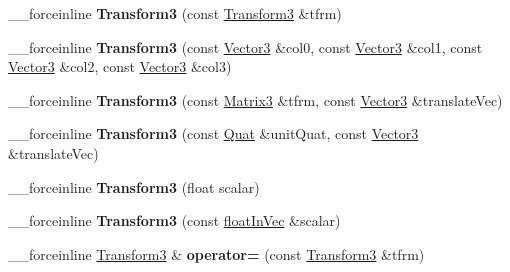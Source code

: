 \begin{DoxyCompactItemize}
\item 
\hypertarget{classVectormath_1_1Aos_1_1Transform3_a1b65bd72a55a4edb987e0eb8ae11c955}{\-\_\-\-\_\-forceinline {\bfseries Transform3} (const \hyperlink{classVectormath_1_1Aos_1_1Transform3}{Transform3} \&tfrm)}\label{classVectormath_1_1Aos_1_1Transform3_a1b65bd72a55a4edb987e0eb8ae11c955}

\item 
\hypertarget{classVectormath_1_1Aos_1_1Transform3_a5ee59b63263a7a38c97a17f1e32a701f}{\-\_\-\-\_\-forceinline {\bfseries Transform3} (const \hyperlink{classVectormath_1_1Aos_1_1Vector3}{Vector3} \&col0, const \hyperlink{classVectormath_1_1Aos_1_1Vector3}{Vector3} \&col1, const \hyperlink{classVectormath_1_1Aos_1_1Vector3}{Vector3} \&col2, const \hyperlink{classVectormath_1_1Aos_1_1Vector3}{Vector3} \&col3)}\label{classVectormath_1_1Aos_1_1Transform3_a5ee59b63263a7a38c97a17f1e32a701f}

\item 
\hypertarget{classVectormath_1_1Aos_1_1Transform3_a054faf5eb727d2c7ea2c139021e3ae63}{\-\_\-\-\_\-forceinline {\bfseries Transform3} (const \hyperlink{classVectormath_1_1Aos_1_1Matrix3}{Matrix3} \&tfrm, const \hyperlink{classVectormath_1_1Aos_1_1Vector3}{Vector3} \&translate\-Vec)}\label{classVectormath_1_1Aos_1_1Transform3_a054faf5eb727d2c7ea2c139021e3ae63}

\item 
\hypertarget{classVectormath_1_1Aos_1_1Transform3_a8d405d0b50131b6908dffce445629669}{\-\_\-\-\_\-forceinline {\bfseries Transform3} (const \hyperlink{classVectormath_1_1Aos_1_1Quat}{Quat} \&unit\-Quat, const \hyperlink{classVectormath_1_1Aos_1_1Vector3}{Vector3} \&translate\-Vec)}\label{classVectormath_1_1Aos_1_1Transform3_a8d405d0b50131b6908dffce445629669}

\item 
\hypertarget{classVectormath_1_1Aos_1_1Transform3_ae587c0b9a9678eb7cfb73659886cc0c1}{\-\_\-\-\_\-forceinline {\bfseries Transform3} (float scalar)}\label{classVectormath_1_1Aos_1_1Transform3_ae587c0b9a9678eb7cfb73659886cc0c1}

\item 
\hypertarget{classVectormath_1_1Aos_1_1Transform3_ae170e79e6b4060d7e62dfa3db1188fc9}{\-\_\-\-\_\-forceinline {\bfseries Transform3} (const \hyperlink{classVectormath_1_1floatInVec}{float\-In\-Vec} \&scalar)}\label{classVectormath_1_1Aos_1_1Transform3_ae170e79e6b4060d7e62dfa3db1188fc9}

\item 
\hypertarget{classVectormath_1_1Aos_1_1Transform3_a5bef55068a0b75056fdadb6fb6a02e69}{\-\_\-\-\_\-forceinline \hyperlink{classVectormath_1_1Aos_1_1Transform3}{Transform3} \& {\bfseries operator=} (const \hyperlink{classVectormath_1_1Aos_1_1Transform3}{Transform3} \&tfrm)}\label{classVectormath_1_1Aos_1_1Transform3_a5bef55068a0b75056fdadb6fb6a02e69}


\end{DoxyCompactItemize}
